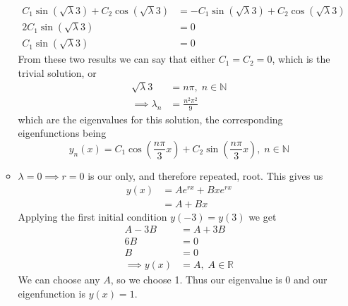 \documentclass[12pt]{article}
\numberwithin{equation}{section}
\numberwithin{figure}{section}
\begin{document}
\begin{enumerate}
\begin{itemize}
\begin{align*}
                C_1\sin(\sqrt{\lambda} 3)+C_2\cos(\sqrt{\lambda} 3)&=-C_1\sin(\sqrt{\lambda} 3)+C_2\cos(\sqrt{\lambda} 3)\\
                2C_1\sin(\sqrt{\lambda} 3)&=0\\
                C_1\sin(\sqrt{\lambda} 3)&=0
            \end{align*}
            From these two results we can say that either $C_1=C_2=0$, which is the trivial solution, or 
            \begin{align*}
                \sqrt{\lambda}3&=n\pi,\; n\in\mathbb{N}\\
                \implies \lambda_n&=\frac{n^2\pi^2}{9}
            \end{align*}
            which are the eigenvalues for this solution, the corresponding eigenfunctions being 
            \begin{equation*}
                y_n(x)=C_1\cos(\frac{n\pi}{3}x)+C_2\sin(\frac{n\pi}{3}x),\; n\in\mathbb{N}
            \end{equation*}

            \item $\lambda=0\implies r=0$ is our only, and therefore repeated, root. This gives us
            \begin{align*}
                y(x)&=Ae^{rx}+Bxe^{rx}\\
                &=A+Bx
            \end{align*}
            Applying the first initial condition $y(-3)=y(3)$ we get 
            \begin{align*}
                A-3B&=A+3B\\
                6B&=0\\
                B&=0\\
                \implies y(x)&=A,\; A\in\mathbb{R}
            \end{align*}
            We can choose any $A$, so we choose 1. Thus our eigenvalue is 0 and our eigenfunction is $y(x)=1$.


\end{itemize}
\end{enumerate}
\end{document}
